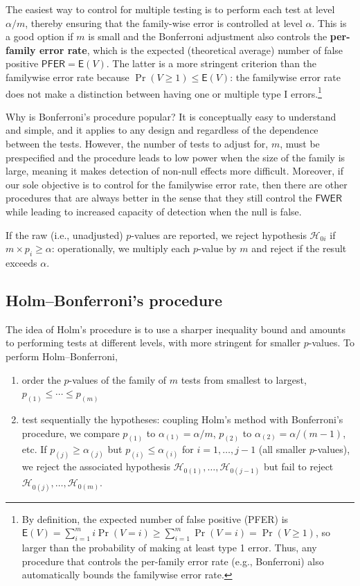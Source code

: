 \documentclass[
  11pt,
  letterpaper,
]{scrbook}
\providecommand{\tightlist}{%
  \setlength{\itemsep}{0pt}\setlength{\parskip}{0pt}}\usepackage{longtable,booktabs,array}
\theoremstyle{definition}
\theoremstyle{definition}
\theoremstyle{remark}
\begin{document}
The easiest way to control for multiple testing is to perform each test
at level \(\alpha/m\), thereby ensuring that the family-wise error is
controlled at level \(\alpha\). This is a good option if \(m\) is small
and the Bonferroni adjustment also controls the \textbf{per-family error
rate}, which is the expected (theoretical average) number of false
positive \(\mathsf{PFER} = \mathsf{E}(V)\). The latter is a more
stringent criterion than the familywise error rate because
\(\Pr(V \geq 1) \leq \mathsf{E}(V)\): the familywise error rate does not
make a distinction between having one or multiple type I
errors.\footnote{By definition, the expected number of false positive
  (PFER) is
  \(\mathsf{E}(V) = \sum_{i=1}^m i \Pr(V=i) \geq \sum_{i=1}^m \Pr(V=i) = \Pr(V \geq 1)\),
  so larger than the probability of making at least type 1 error. Thus,
  any procedure that controls the per-family error rate (e.g.,
  Bonferroni) also automatically bounds the familywise error rate.}

Why is Bonferroni's procedure popular? It is conceptually easy to
understand and simple, and it applies to any design and regardless of
the dependence between the tests. However, the number of tests to adjust
for, \(m\), must be prespecified and the procedure leads to low power
when the size of the family is large, meaning it makes detection of
non-null effects more difficult. Moreover, if our sole objective is to
control for the familywise error rate, then there are other procedures
that are always better in the sense that they still control the
\(\mathsf{FWER}\) while leading to increased capacity of detection when
the null is false.

If the raw (i.e., unadjusted) \(p\)-values are reported, we reject
hypothesis \(\mathscr{H}_{0i}\) if \(m \times p_i \ge \alpha\):
operationally, we multiply each \(p\)-value by \(m\) and reject if the
result exceeds \(\alpha\).

\subsection{Holm--Bonferroni's
procedure}\label{holmbonferronis-procedure}

The idea of Holm's procedure is to use a sharper inequality bound and
amounts to performing tests at different levels, with more stringent for
smaller \(p\)-values. To perform Holm--Bonferroni,

\begin{enumerate}
\def\labelenumi{\arabic{enumi}.}
\tightlist
\item
  order the \(p\)-values of the family of \(m\) tests from smallest to
  largest, \(p_{(1)} \leq \cdots \leq p_{(m)}\)
\item
  test sequentially the hypotheses: coupling Holm's method with
  Bonferroni's procedure, we compare \(p_{(1)}\) to
  \(\alpha_{(1)} = \alpha/m\), \(p_{(2)}\) to
  \(\alpha_{(2)}=\alpha/(m-1)\), etc. If \(p_{(j)} \geq \alpha_{(j)}\)
  but \(p_{(i)} \leq \alpha_{(i)}\) for \(i=1, \ldots, j-1\) (all
  smaller \(p\)-values), we reject the associated hypothesis
  \(\mathscr{H}_{0(1)}, \ldots, \mathscr{H}_{0(j-1)}\) but fail to
  reject \(\mathscr{H}_{0(j)}, \ldots, \mathscr{H}_{0(m)}\).
\end{enumerate}
\end{document}
